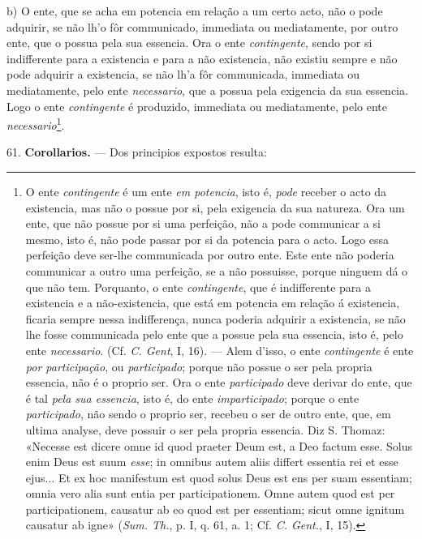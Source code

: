 b) O ente, que se acha em potencia em relação a um certo acto, não o pode adquirir, se não lh'o fôr communicado, immediata ou mediatamente, por outro ente, que o possua pela sua essencia. Ora o ente \emph{contingente}, sendo por si indifferente para a existencia e para a não existencia, não existiu sempre e não pode adquirir a existencia, se não lh'a fôr communicada, immediata ou mediatamente, pelo ente \emph{necessario}, que a possua pela exigencia da sua essencia. Logo o ente \emph{contingente} é produzido, immediata ou mediatamente, pelo ente \emph{necessario}\footnote{O ente \emph{contingente} é um ente \emph{em potencia}, isto é, \emph{pode} receber o acto da existencia, mas não o possue por si, pela exigencia da sua natureza. Ora um ente, que não possue por si uma perfeição, não a pode communicar a si mesmo, isto é, não pode passar por si da potencia para o acto. Logo essa perfeição deve ser-lhe communicada por outro ente. Este ente não poderia communicar a outro uma perfeição, se a não possuisse, porque ninguem dá o que não tem. Porquanto, o ente \emph{contingente}, que é indifferente para a existencia e a não-existencia, que está em potencia em relação á existencia, ficaria sempre nessa indifferença, nunca poderia adquirir a existencia, se não lhe fosse communicada pelo ente que a possue pela sua essencia, isto é, pelo ente \emph{necessario}. (Cf. \emph{C. Gent}, I, 16). --- Alem d'isso, o ente \emph{contingente} é ente \emph{por participação}, ou \emph{participado}; porque não possue o ser pela propria essencia, não é o proprio ser. Ora o ente \emph{participado} deve derivar do ente, que é tal \emph{pela sua essencia}, isto é, do ente \emph{imparticipado}; porque o ente \emph{participado}, não sendo o proprio ser, recebeu o ser de outro ente, que, em ultima analyse, deve possuir o ser pela propria essencia. Diz S. Thomaz: «Necesse est dicere omne id quod praeter Deum est, a Deo factum esse. Solus enim Deus est suum \emph{esse}; in omnibus autem aliis differt essentia rei et esse ejus... Et ex hoc manifestum est quod solus Deus est ens per suam essentiam; omnia vero alia sunt entia per participationem. Omne autem quod est per participationem, causatur ab eo quod est per essentiam; sicut omne ignitum causatur ab igne» (\emph{Sum. Th.}, p. I, q. 61, a. 1; Cf. \emph{C. Gent.}, I, 15).}.


61. \textbf{Corollarios.} --- Dos principios expostos resulta:

